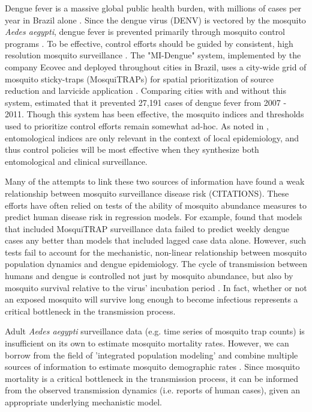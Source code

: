 \documentclass[10pt,letterpaper]{article}
\begin{document}
Dengue fever is a massive global public health burden, with millions of cases per year in Brazil alone \cite{Bhatt2013}.  
Since the dengue virus (DENV) is vectored by the mosquito \textit{Aedes aegypti}, dengue fever is prevented primarily through mosquito control programs \cite{Achee2015}.
To be effective, control efforts should be guided by consistent, high resolution mosquito surveillance \cite{Morrison2008}.
The "MI-Dengue" system, implemented by the company Ecovec and deployed throughout cities in Brazil, uses a city-wide grid of mosquito sticky-traps (MosquiTRAPs) for spatial prioritization of source reduction and larvicide application \cite{Eiras2009}.
Comparing cities with and without this system, \cite{Pepin2013} estimated that it prevented 27,191 cases of dengue fever from 2007 - 2011.
Though this system has been effective, the mosquito indices and thresholds used to prioritize control efforts remain somewhat ad-hoc.
As noted in \cite{Morrison2008}, entomological indices are only relevant in the context of local epidemiology, and thus control policies will be most effective when they synthesize both entomological and clinical surveillance.

Many of the attempts to link these two sources of information have found a weak relationship between mosquito surveillance disease risk (CITATIONS).
These efforts have often relied on tests of the ability of mosquito abundance measures to predict human disease risk in regression models.
For example, \cite{Pepin2015} found that models that included MosquiTRAP surveillance data failed to predict weekly dengue cases any better than models that included lagged case data alone.
However, such tests fail to account for the mechanistic, non-linear relationship between mosquito population dynamics and dengue epidemiology.
The cycle of transmission between humans and dengue is controlled not just by mosquito abundance, but also by mosquito survival relative to the virus' incubation period \cite{Achee2015}.
In fact, whether or not an exposed mosquito will survive long enough to become infectious represents a critical bottleneck in the transmission process.

Adult \textit{Aedes aegypti} surveillance data (e.g. time series of mosquito trap counts) is insufficient on its own to estimate mosquito mortality rates.
However, we can borrow from the field of 'integrated population modeling' and combine multiple sources of information to estimate mosquito demographic rates \cite{Schaub2010}.
Since mosquito mortality is a critical bottleneck in the transmission process, it can be informed from the observed transmission dynamics (i.e. reports of human cases), given an appropriate underlying mechanistic model.
\end{document}
